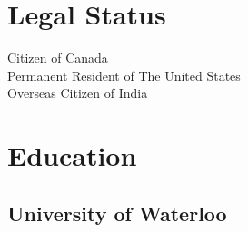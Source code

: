 \documentclass[letterpaper]{deedy-resume} %
\begin{document}
\begin{minipage}[t]{0.33\textwidth} %


  \section{Legal Status} 

  Citizen of Canada \\
  Permanent Resident of The United States \\
  Overseas Citizen of India

  \sectionspace %


  \section{Education} 

  \subsection{University of Waterloo}


  \sectionspace %









\end{minipage}
\end{document}
